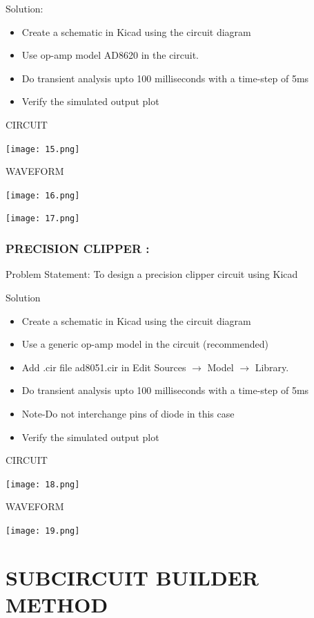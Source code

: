 \documentclass[12pt,a4paper]{  report}
\begin{document}
Solution:
\begin{itemize}
\item Create a schematic in Kicad using the circuit diagram
\item Use op-amp model AD8620 in the circuit.
\item Do transient analysis upto 100 milliseconds with a time-step of 5ms
\item Verify the simulated output plot
\end{itemize}
CIRCUIT
\begin{flushleft}
\texttt{[image: 15.png]}
\end{flushleft}
WAVEFORM
\begin{flushleft}
\texttt{[image: 16.png]}
\end{flushleft}
\begin{flushleft}
\texttt{[image: 17.png]}
\end{flushleft}
\subsection{PRECISION CLIPPER :}
Problem Statement:
To design a precision clipper circuit using Kicad

Solution
\begin{itemize}
\item Create a schematic in Kicad using the circuit diagram
\item Use a generic op-amp model in the circuit (recommended)
\item Add .cir file ad8051.cir  in Edit Sources $\rightarrow$ Model $\rightarrow$ Library.
\item Do transient analysis upto 100 milliseconds with a time-step of 5ms
\item Note-Do not interchange pins of diode in this case
\item Verify  the simulated output plot
\end{itemize}
CIRCUIT
\begin{flushleft}
\texttt{[image: 18.png]}
\end{flushleft}
WAVEFORM
\begin{flushleft}
\texttt{[image: 19.png]}
\end{flushleft}
\newpage
\chapter{\textbf{SUBCIRCUIT BUILDER METHOD}}
\end{document}
